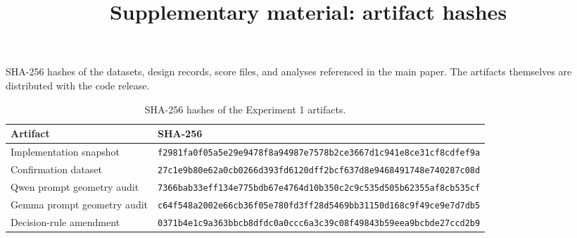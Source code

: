 \documentclass[10pt]{article}
\title{Supplementary material: artifact hashes}
\newcommand{\lit}[1]{\texttt{#1}}
\begin{document}
\maketitle
SHA-256 hashes of the datasets, design records, score files, and analyses referenced in the main paper. The artifacts themselves are distributed with the code release.

\begin{table}[h!]
\caption{SHA-256 hashes of the Experiment 1 artifacts.}
\label{tab:c-hashes}
\begin{center}
\footnotesize
\begin{tabular}{@{}ll@{}}
\toprule
Artifact & SHA-256 \\
\midrule
Implementation snapshot & \lit{f2981fa0f05a5e29e9478f8a94987e7578b2ce3667d1c941e8ce31cf8cdfef9a} \\
Confirmation dataset & \lit{27c1e9b80e62a0cb0266d393fd6120dff2bcf637d8e9468491748e740287c08d} \\
Qwen prompt geometry audit & \lit{7366bab33eff134e775bdb67e4764d10b350c2c9c535d505b62355af8cb535cf} \\
Gemma prompt geometry audit & \lit{c64f548a2002e66cb36f05e780fd3ff28d5469bb31150d168c9f49ce9e7d7db5} \\
Decision-rule amendment & \lit{0371b4e1c9a363bbcb8dfdc0a0ccc6a3c39c08f49843b59eea9bcbde27ccd2b9} \\
\bottomrule
\end{tabular}
\end{center}
\end{table}
\end{document}
